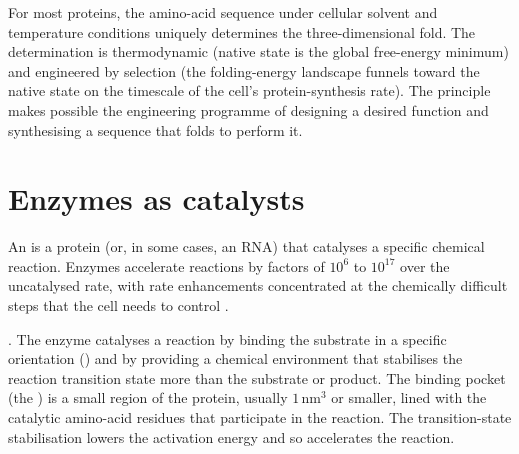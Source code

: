 \begin{principle}
For most proteins, the amino-acid sequence under cellular solvent and
temperature conditions uniquely determines the three-dimensional
fold. The determination is thermodynamic (native state is the
global free-energy minimum) and engineered by selection (the
folding-energy landscape funnels toward the native state on the
timescale of the cell's protein-synthesis rate). The principle
makes possible the engineering programme of designing a desired
function and synthesising a sequence that folds to perform it.
\end{principle}

\section{Enzymes as catalysts}

An  is a protein (or, in some cases, an RNA) that
catalyses a specific chemical reaction. Enzymes accelerate reactions
by factors of $10^6$ to $10^{17}$ over the uncatalysed rate, with
rate enhancements concentrated at the chemically difficult steps that
the cell needs to control \cite[ch.~6]{text:lehninger-biochemistry}.

. The enzyme catalyses a reaction by
binding the substrate in a specific orientation () and by providing a chemical environment that stabilises
the reaction transition state more than the substrate or product. The
binding pocket (the ) is a small region of the
protein, usually $1\,\text{nm}^3$ or smaller, lined with the catalytic
amino-acid residues that participate in the reaction. The
transition-state stabilisation lowers the activation energy and so
accelerates the reaction.

